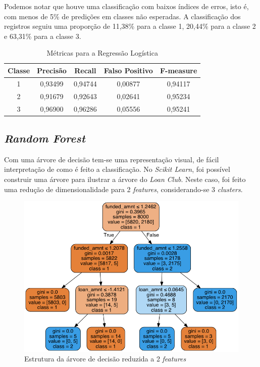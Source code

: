 Podemos notar que houve uma classificação com baixos índices de erros, isto é, com menos de 5\% de predições em classes não esperadas. A classificação dos registros seguiu uma proporção de 11,38\% para a classe 1, 20,44\% para a classe 2 e 63,31\% para a classe 3.

\begin{table}[!ht]
  \caption{Métricas para a Regressão Logística}
  \centering
  \begin{tabular}{ c c c c c } \toprule
  Classe & Precisão & Recall  & Falso Positivo & F-measure  \\\midrule
    1    & 0,93499  & 0,94744 & 0,00877        & 0,94117    \\
    2    & 0,91679  & 0,92643 & 0,02641        & 0,95234    \\
    3    & 0,96900  & 0,96286 & 0,05556        & 0,95241 \\\bottomrule
\end{tabular}
\end{table}

\subsection{\emph{Random Forest}}


Com uma árvore de decisão tem-se uma representação visual, de fácil interpretação de como é feito a classificação. No \emph{Scikit Learn}, foi possível construir uma árvore para ilustrar a árvore do \emph{Loan Club}. Neste caso, foi feito uma redução de dimensionalidade para 2 \emph{features}, considerando-se 3 \emph{clusters}.



\begin{figure}[!ht]
\caption{Estrutura da \'arvore de decis\~ao reduzida a 2 \emph{features}}
\centerline{\includegraphics[width=.7\textwidth]{img/loan}}
\end{figure}

